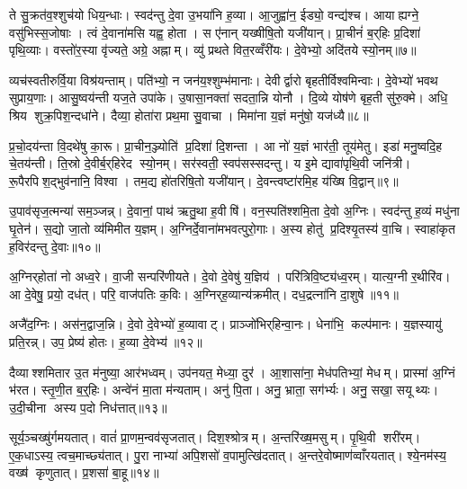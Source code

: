 ते सु॒क्रत॑व॒श्शुच॑यो धिय॒न्धाः। स्वद॑न्तु दे॒वा उ॒भया॑नि ह॒व्या। आ॒जुह्वा॑न॒ ईड्यो॒ वन्द्य॑श्च। आयाह्यग्ने॒ वसु॑भिस्स॒जोषाः। त्वं दे॒वाना॑मसि यह्व॒ होता। स ए॑नान् यख्षीषि॒तो यजी॑यान्। प्रा॒चीनं॑ ब॒र्‌हिः प्र॒दिशा॑ पृथि॒व्याः। वस्तो॑र॒स्या वृ॑ज्यते॒ अग्रे॒ अह्नाम्। व्यु॑ प्रथते वित॒रव्वँरी॑यः। दे॒वेभ्यो॒ अदि॑तये स्यो॒नम्॥७॥

व्यच॑स्वतीरुर्वि॒या विश्र॑यन्ताम्। पति॑भ्यो॒ न जन॑य॒श्शुम्भ॑मानाः। देवीर्द्वारो बृहतीर्विश्वमिन्वाः। दे॒वेभ्यो॑ भवथ सुप्राय॒णाः। आसु॒ष्वय॑न्ती यज॒ते उपा॑के। उ॒षासा॒नक्ता॑ सदता॒न्नि योनौ। दि॒व्ये योष॑णे बृह॒ती सु॑रु॒क्मे। अधि॒ श्रिय शुक्र॒पिश॒न्दधा॑ने। दैव्या॒ होता॑रा प्रथ॒मा सु॒वाचा। मिमा॑ना य॒ज्ञं मनु॑षो॒ यज॑ध्यै॥८॥

प्र॒चो॒दय॑न्ता वि॒दथे॑षु का॒रू। प्रा॒चीन॒ञ्ज्योति॑ प्र॒दिशा॑ दि॒शन्ता। आ नो॑ य॒ज्ञं भार॑ती॒ तूय॑मेतु। इडा॑ मनु॒ष्वदि॒ह चे॒तय॑न्ती। ति॒स्रो दे॒वीर्ब॒र्‌हिरेद स्यो॒नम्। सर॑स्वती॒ स्वप॑सस्सदन्तु। य इ॒मे द्यावा॑पृथि॒वी जनि॑त्री। रू॒पैरपिश॒द्भुव॑नानि॒ विश्वा। तम॒द्य हो॑तरिषि॒तो यजी॑यान्। दे॒वन्त्वष्टा॑रमि॒ह य॑ख्षि वि॒द्वान्॥९॥

उ॒पाव॑सृज॒त्मन्या॑ सम॒ञ्जन्न्। दे॒वानां॒ पाथ॑ ऋतु॒था ह॒वीषि॑। वन॒स्पति॑श्शमि॒ता दे॒वो अ॒ग्निः। स्वद॑न्तु ह॒व्यं मधु॑ना घृ॒तेन॑। स॒द्यो जा॒तो व्य॑मिमीत य॒ज्ञम्। अ॒ग्निर्दे॒वाना॑मभवत्पुरो॒गाः। अ॒स्य होतु॑ प्र॒दिश्यृ॒तस्य॑ वा॒चि। स्वाहा॑कृत ह॒विर॑दन्तु दे॒वाः॥१०॥\anuvakamend[य॒ज्ञैस्स्यो॒नं यज॑ध्यै वि॒द्वान॒ष्टौ च॑]

अ॒ग्निर्‌होता॑ नो अध्व॒रे। वा॒जी सन्परि॑णीयते। दे॒वो दे॒वेषु॑ य॒ज्ञिय॑। परि॑त्रिवि॒ष्ट्य॑ध्व॒रम्। यात्य॒ग्नी र॒थीरि॑व। आ दे॒वेषु॒ प्रयो॒ दध॑त्। परि॒ वाज॑पतिः क॒विः। अ॒ग्निर्‌ह॒व्यान्य॑क्रमीत्। दध॒द्रत्ना॑नि दा॒शुषे॥११॥\anuvakamend[अ॒ग्निर्‌होता॑ नो॒ नव॑]

अजै॑द॒ग्निः। अस॑न॒द्वाज॒न्नि। दे॒वो दे॒वेभ्यो॑ ह॒व्यावाट्। प्राञ्जो॑भिर्‌हिन्वा॒नः। धेना॑भि॒ कल्प॑मानः। य॒ज्ञस्यायु॑ प्रति॒रन्न्। उप॒ प्रेष्य॑ होतः। ह॒व्या दे॒वेभ्य॑॥१२॥\anuvakamend[अजै॑द॒ष्टौ]

दैव्याश्शमितार उ॒त म॑नुष्या॒ आर॑भध्वम्। उप॑नयत॒ मेध्या॒ दुर॑। आ॒शासा॑ना॒ मेध॑पतिभ्यां॒ मेधम्। प्रास्मा॑ अ॒ग्निं भ॑रत। स्तृ॒णी॒त ब॒र्॒हिः। अन्वे॑नं मा॒ता म॑न्यताम्। अनु॑ पि॒ता। अनु॒ भ्राता॒ सग॑र्भ्यः। अनु॒ सखा॒ सयूथ्यः। उ॒दी॒चीना अस्य प॒दो निध॑त्तात्॥१३॥

सूर्य॒ञ्चख्षु॑र्गमयतात्। वातं॑ प्रा॒णम॒न्वव॑सृजतात्। दिश॒श्श्रोत्रम्। अ॒न्तरि॑ख्ष॒मसुम्। पृ॒थि॒वी शरी॑रम्। ए॒क॒धाऽस्य॒ त्वच॒माच्छ्य॑तात्। पु॒रा नाभ्या॑ अपि॒शसो॑ व॒पामुत्खि॑दतात्। अ॒न्तरे॒वोष्माण॑व्वाँरयतात्। श्ये॒नम॑स्य॒ वख्ष॑ कृणुतात्। प्र॒शसा॑ बा॒हू॥१४॥

